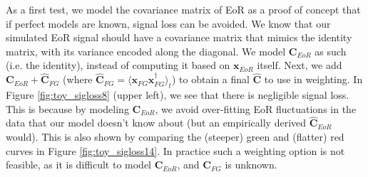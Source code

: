 \documentclass[preprint2,numberedappendix,tighten]{aastex6}  %
\begin{document}
As a first test, we model the covariance matrix of EoR as a proof of concept that if perfect models are known, signal loss can be 
avoided. We know that our simulated EoR signal should have a covariance matrix that mimics the identity matrix, with its 
variance encoded along the diagonal. We model $\textbf{C}_{EoR}$ as such (i.e. the identity), instead of computing it based on $\textbf{x}
_{EoR}$ itself. Next, we add $\textbf{C}_{EoR} + \widehat{\textbf{C}}_{FG}$ (where $\widehat{\textbf{C}}_{FG} = \langle\textbf{x}_{FG}
\textbf{x}_{FG}^{\dagger}\rangle_{t}$) to obtain a final $\widehat{\textbf{C}}$ to use in weighting. In Figure \ref{fig:toy_sigloss8} (upper 
left), we see that there is negligible signal loss. This is because by modeling $\textbf{C}_{EoR}$, we avoid over-fitting EoR fluctuations in the data that our model doesn't know about (but an empirically derived $\widehat{\textbf{C}}_{EoR}$ would). This is also shown by comparing the (steeper) green and (flatter) red curves in Figure \ref{fig:toy_sigloss14}. In practice such a weighting option is not feasible, as it is difficult to model $\textbf{C}_{EoR}$, and $\textbf{C}_{FG}$ is unknown.
\end{document}
